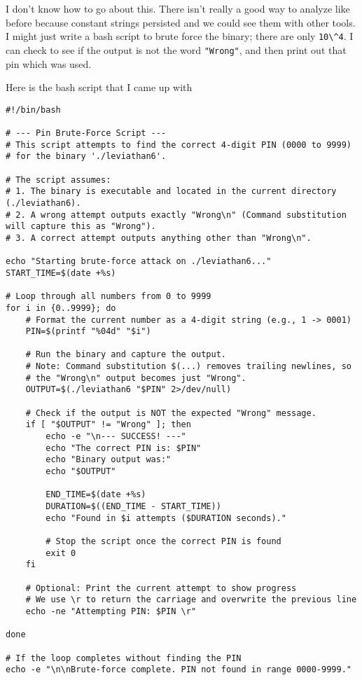 \documentclass[11pt]{article}
\begin{document}
I don't know how to go about this. There isn't really a good way to analyze like before because constant strings persisted and we could see them with other tools. I might just write a bash script to brute force the binary; there are only \verb|10\^4|. I can check to see if the output is not the word \verb|"Wrong"|, and then print out that pin which was used.

Here is the bash script that I came up with
\begin{lstlisting}
#!/bin/bash

# --- Pin Brute-Force Script ---
# This script attempts to find the correct 4-digit PIN (0000 to 9999)
# for the binary './leviathan6'.

# The script assumes:
# 1. The binary is executable and located in the current directory (./leviathan6).
# 2. A wrong attempt outputs exactly "Wrong\n" (Command substitution will capture this as "Wrong").
# 3. A correct attempt outputs anything other than "Wrong\n".

echo "Starting brute-force attack on ./leviathan6..."
START_TIME=$(date +%s)

# Loop through all numbers from 0 to 9999
for i in {0..9999}; do
    # Format the current number as a 4-digit string (e.g., 1 -> 0001)
    PIN=$(printf "%04d" "$i")

    # Run the binary and capture the output.
    # Note: Command substitution $(...) removes trailing newlines, so 
    # the "Wrong\n" output becomes just "Wrong".
    OUTPUT=$(./leviathan6 "$PIN" 2>/dev/null)

    # Check if the output is NOT the expected "Wrong" message.
    if [ "$OUTPUT" != "Wrong" ]; then
        echo -e "\n--- SUCCESS! ---"
        echo "The correct PIN is: $PIN"
        echo "Binary output was:"
        echo "$OUTPUT"
        
        END_TIME=$(date +%s)
        DURATION=$((END_TIME - START_TIME))
        echo "Found in $i attempts ($DURATION seconds)."
        
        # Stop the script once the correct PIN is found
        exit 0 
    fi

    # Optional: Print the current attempt to show progress
    # We use \r to return the carriage and overwrite the previous line
    echo -ne "Attempting PIN: $PIN \r"

done

# If the loop completes without finding the PIN
echo -e "\n\nBrute-force complete. PIN not found in range 0000-9999."
\end{lstlisting}
\end{document}
